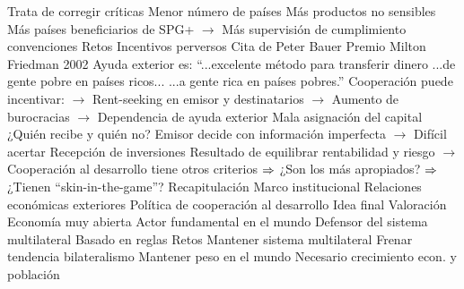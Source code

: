 \documentclass{nuevotema}
\begin{document}
\begin{esquemal}
				\4[] Trata de corregir críticas
				\4[] Menor número de países
				\4[] Más productos no sensibles
				\4[] Más países beneficiarios de SPG+
				\4[] $\to$ Más supervisión de cumplimiento convenciones
		\2 Retos
			\3 Incentivos perversos
				\4 Cita de Peter Bauer
				\4[] Premio Milton Friedman 2002
				\4[] Ayuda exterior es:
				\4[] ``...excelente método para transferir dinero
				\4[] ...de gente pobre en países ricos...
				\4[] ...a gente rica en países pobres.''
				\4 Cooperación puede incentivar:
				\4[] $\to$ Rent-seeking en emisor y destinatarios
				\4[] $\to$ Aumento de burocracias
				\4[] $\to$ Dependencia de ayuda exterior
			\3 Mala asignación del capital
				\4 ¿Quién recibe y quién no?
				\4[] Emisor decide con información imperfecta
				\4[] $\to$ Difícil acertar
				\4 Recepción de inversiones
				\4[] Resultado de equilibrar rentabilidad y riesgo
				\4[] $\to$ Cooperación al desarrollo tiene otros criterios
				\4[] $\Rightarrow$ ¿Son los más apropiados?
				\4[] $\Rightarrow$ ¿Tienen ``skin-in-the-game''?
	\1[] 
		\2 Recapitulación
			\3 Marco institucional
			\3 Relaciones económicas exteriores
			\3 Política de cooperación al desarrollo
		\2 Idea final
			\3 Valoración
				\4 Economía muy abierta
				\4 Actor fundamental en el mundo
				\4 Defensor del sistema multilateral
				\4[] Basado en reglas
			\3 Retos
				\4 Mantener sistema multilateral
				\4[] Frenar tendencia bilateralismo
				\4 Mantener peso en el mundo
				\4[] Necesario crecimiento econ. y población
\end{esquemal}
\end{document}
